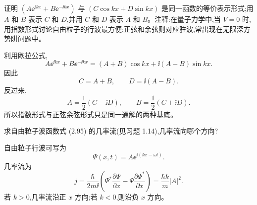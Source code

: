 \begin{question}
证明 $(A\ee^{\ii kx}+B\ee^{-\ii kx})$ 与 $(C\cos kx+D\sin kx)$ 是同一函数的等价表示形式;用 $A$ 和 $B$ 表示 $C$ 和 $D$,并用 $C$ 和 $D$ 表示 $A$ 和 $B$。注释:在量子力学中,当 $V=0$ 时,用指数形式讨论自由粒子的行波最方便;正弦和余弦则对应驻波,常出现在无限深方势阱问题中。
\end{question}
\begin{solution}
利用欧拉公式,
\[
A\ee^{\ii kx}+B\ee^{-\ii kx}
=(A+B)\cos kx+\ii(A-B)\sin kx.
\]
因此
\[
C=A+B,
\qquad
D=\ii(A-B).
\]
反过来,
\[
A=\frac12(C-\ii D),
\qquad
B=\frac12(C+\ii D).
\]
所以指数形式与正弦余弦形式只是同一通解的两种基底。
\end{solution}

\begin{question}
求自由粒子波函数式 (2.95) 的几率流(见习题 1.14),几率流向哪个方向?

\par\smallskip
{}

\end{question}
\begin{solution}
自由粒子行波可写为
\[
\Psi(x,t)=A\ee^{\ii(kx-\omega t)}.
\]
几率流为
\[
j=\frac{\hbar}{2m\ii}\left(\Psi^*\frac{\partial\Psi}{\partial x}-\Psi\frac{\partial\Psi^*}{\partial x}\right)
=\frac{\hbar k}{m}|A|^2.
\]
若 $k>0$,几率流沿正 $x$ 方向;若 $k<0$,则沿负 $x$ 方向。
\end{solution}

